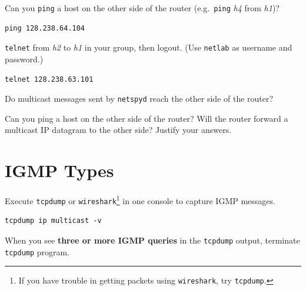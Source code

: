 \documentclass{../UTNetLab}
\begin{document}
    Can you \lstinline{ping} a host on the other side of the router (e.g.\ \lstinline{ping} \textit{h4} from \textit{h1})?

    \begin{lstlisting}
ping 128.238.64.104
    \end{lstlisting}

    \lstinline{telnet} from \textit{h2} to \textit{h1} in your group, then logout. (Use \texttt{netlab} as username and password.)

    \begin{lstlisting}
telnet 128.238.63.101
    \end{lstlisting}
    Do multicast messages sent by \lstinline{netspyd} reach the other side of the router?

    
    \begin{report}
        \item Can you ping a host on the other side of the router?
            Will the router forward a multicast IP datagram to the other side?
            Justify your answers.
    \end{report}

\section{IGMP Types}
    Execute \lstinline{tcpdump} or \lstinline{wireshark}\footnote{If you have trouble in getting packets using \lstinline{wireshark}, try \lstinline{tcpdump}.} in one console to capture IGMP messages.

    \begin{lstlisting}[emph={eth0}]
tcpdump ip multicast -v
    \end{lstlisting}
    When you see \textbf{three or more IGMP queries} in the \lstinline{tcpdump} output, terminate \lstinline{tcpdump} program.
\end{document}
